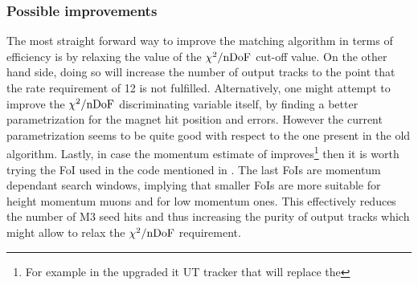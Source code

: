 \subsubsection{Possible improvements}
The most straight forward way to improve the matching algorithm in terms of efficiency is
by relaxing the value of the $\chi^2/{\rm nDoF}$ cut-off value. On the other hand side, doing so will increase the number
of output tracks to the point that the \hltone rate requirement of 12 \khz is not fulfilled.
Alternatively, one might attempt to improve the $\chi^2/{\rm nDoF}$ discriminating variable itself,
by finding a better parametrization for the magnet hit position and errors. However the current
parametrization seems to be quite good with respect to the one present in the old \mvm algorithm.
Lastly, in case the momentum estimate of \ttracker improves\footnote{For example in the upgraded it
UT tracker that will replace the \ttracker} then it is worth trying the FoI used in the \muonID code
mentioned in . The last FoIs are momentum dependant search windows, implying
that smaller FoIs are more suitable for height momentum muons and \viceversa for low momentum ones.
This effectively reduces the number of M3 seed hits and thus increasing the purity of output tracks
which might allow to relax the $\chi^2/{\rm nDoF}$ requirement.
